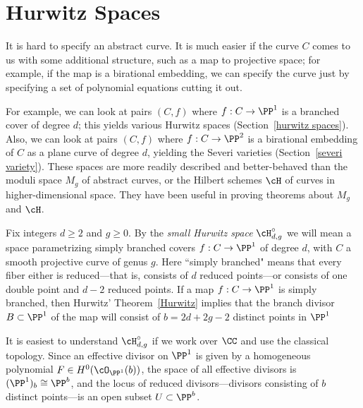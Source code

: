 \section{Hurwitz Spaces}

It is hard to specify an abstract curve. It is much easier if the curve $C$ comes to us with some additional structure, such as a map to projective space; for example, if the map is a birational embedding, we can specify the curve just by specifying a set of polynomial equations cutting it out. 

For example, we can look at pairs $(C,f)$ where $f : C \to \PP^1$ is a branched cover of degree $d$; this yields various Hurwitz spaces (Section~\ref{hurwitz spaces}).
Also, we can look at pairs $(C,f)$ where $f : C \to \PP^2$ is a birational embedding of $C$ as a plane curve of degree $d$, yielding the Severi varieties (Section~\ref{severi variety}). These spaces are more readily described and better-behaved than the moduli space $M_g$ of abstract curves, or the Hilbert schemes $\cH$ of curves in higher-dimensional space. They have been useful in proving theorems about $M_g$ and $\cH$.

Fix integers $d \geq 2$ and $g \geq 0$. By the \emph{small Hurwitz space} $\cH^\circ_{d,g}$ we will mean a space parametrizing simply branched covers $f : C \to \PP^1$ of degree $d$, with $C$ a smooth projective curve of genus $g$. Here ``simply branched" means that every fiber  either is reduced---that is, consists of $d$ reduced points---or consists of one double point and $d-2$ reduced points. If a map $f : C \to \PP^1$ is simply branched, then Hurwitz' Theorem~\ref{Hurwitz} implies that the branch divisor $B \subset \PP^1$ of the map will consist of $b = 2d+2g-2$ distinct points in $\PP^1$

It is easiest to understand $\cH^\circ_{d,g}$ if we work over $\CC$ and use the classical topology. Since an effective divisor on $\PP^1$ is given by a homogeneous polynomial $F \in H^0(\cO_{\PP^1}(b))$, the space of all effective divisors is $(\PP^1)_b \cong \PP^b$, and the locus of reduced divisors---divisors consisting of $b$ distinct points---is an open subset $U \subset \PP^b$.


